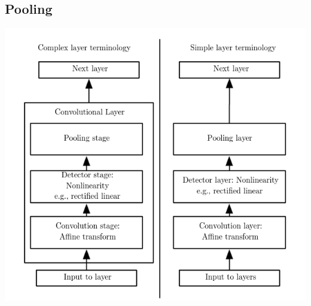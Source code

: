 \documentclass[11pt]{article}
\begin{document}
\subsection{Pooling}
\label{sec:orgc631995}
\begin{center}
\includegraphics[width=.9\linewidth]{Convolutional Networks/screenshot_2018-10-08_10-23-35.png}
\end{center}
\end{document}
